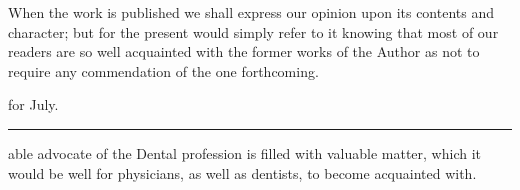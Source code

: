 When the work is published we shall express our opinion upon its
contents and character; but for the present would simply refer to it
knowing that most of our readers are so well acquainted with the former
works of the Author as not to require any commendation of the one
forthcoming.

\smallornament
\footnotesize
{} for July.
\plainbreak{1}
\normalsize

 able advocate of the Dental profession is filled with valuable
matter, which it would be well for physicians, as well as dentists, to
become acquainted with.\endinput
